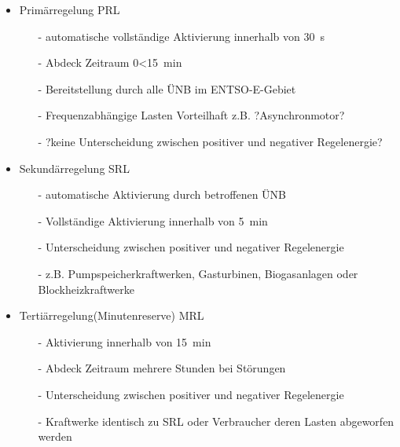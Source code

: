 \documentclass[aspectratio=1610, professionalfonts, 9pt]{beamer}
\begin{document}
\begin{frame}
  \begin{itemize}
    \item Primärregelung PRL
    \begin{itemize}
      \item[-] automatische vollständige Aktivierung innerhalb von \SI{30}{\second}
      \item[-] Abdeck Zeitraum \num{0}<\SI{15}{\minute}
      \item[-] Bereitstellung durch alle ÜNB im ENTSO-E-Gebiet
      \item[-] Frequenzabhängige Lasten Vorteilhaft z.B. ?Asynchronmotor?
      \item[-] ?keine Unterscheidung zwischen positiver und negativer Regelenergie?
    \end{itemize}
    \item Sekundärregelung SRL
    \begin{itemize}
      \item[-] automatische Aktivierung durch betroffenen ÜNB
      \item[-] Vollständige Aktivierung innerhalb von \SI{5}{\minute}
      \item[-] Unterscheidung zwischen positiver und negativer Regelenergie
      \item[-] z.B. Pumpspeicherkraftwerken, Gasturbinen, Biogasanlagen oder Blockheizkraftwerke
    \end{itemize}
    \item Tertiärregelung(Minutenreserve) MRL
    \begin{itemize}
      \item[-] Aktivierung innerhalb von \SI{15}{\minute}
      \item[-] Abdeck Zeitraum mehrere Stunden bei Störungen
      \item[-] Unterscheidung zwischen positiver und negativer Regelenergie
      \item[-] Kraftwerke identisch zu SRL oder Verbraucher deren Lasten abgeworfen werden
    \end{itemize}
  \end{itemize}

\end{frame}
\end{document}
